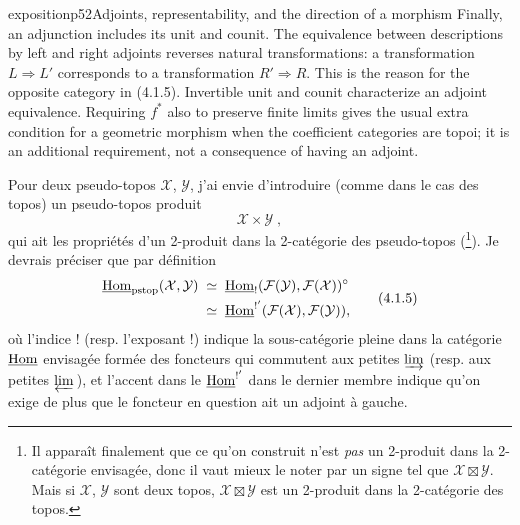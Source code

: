 \begin{dcomment}{exposition}{p52}{Adjoints, representability, and the direction of a morphism}
Finally, an adjunction includes its unit and counit. The equivalence between descriptions by left and right adjoints reverses natural transformations: a transformation $L\Rightarrow L'$ corresponds to a transformation $R'\Rightarrow R$. This is the reason for the opposite category in (4.1.5). Invertible unit and counit characterize an adjoint equivalence. Requiring $f^*$ also to preserve finite limits gives the usual extra condition for a geometric morphism when the coefficient categories are topoi; it is an additional requirement, not a consequence of having an adjoint.
\end{dcomment}


Pour deux pseudo-topos $\mathcal{X}$, $\mathcal{Y}$, j'ai envie d'introduire (comme dans le cas des topos) un pseudo-topos produit
\[
\mathcal{X}\times\mathcal{Y}\;,
\tag*{(4.1.4)}
\]
qui ait les propriétés d'un 2-produit dans la 2-catégorie des pseudo-topos (\footnote{Il apparaît finalement que ce qu'on construit n'est \textit{pas} un 2-produit dans la 2-catégorie envisagée, donc il vaut mieux le noter par un signe tel que $\mathcal{X}\boxtimes\mathcal{Y}$. Mais si $\mathcal{X}$, $\mathcal{Y}$ sont deux topos, $\mathcal{X}\boxtimes\mathcal{Y}$ est un 2-produit dans la 2-catégorie des topos.}). Je devrais préciser que par définition
\[
\begin{aligned}
\uHom_{\pstop}(\mathcal{X},\mathcal{Y}) \;&\simeq\; \uHom_!(\mathcal{F}(\mathcal{Y}),\mathcal{F}(\mathcal{X}))^\circ\\
&\simeq\; \uHom^{!'}(\mathcal{F}(\mathcal{X}),\mathcal{F}(\mathcal{Y})),
\end{aligned}
\tag*{(4.1.5)}
\]
où l'indice ! (resp. l'exposant !) indique la sous-catégorie pleine dans la catégorie $\underline{\mathrm{Hom}}$ envisagée formée des foncteurs qui commutent aux petites $\varinjlim$ (resp. aux petites
$\varprojlim$\,), et l'accent dans le $\underline{\mathrm{Hom}}^{!'}$ dans le dernier membre indique qu'on exige de plus que le foncteur en question ait un adjoint à gauche.


